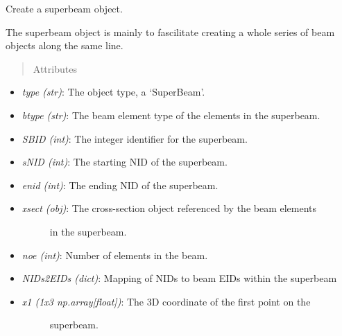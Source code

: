\documentclass[letterpaper,10pt,english]{sphinxmanual}
\begin{document}
\begin{fulllineitems}
\label{structures:AeroComBAT.Structures.SuperBeam}
Create a superbeam object.

The superbeam object is mainly to fascilitate creating a whole series of
beam objects along  the same line.
\begin{quote}\begin{description}
\item[{Attributes}] \leavevmode
\end{description}\end{quote}
\begin{itemize}
\item {} 
\emph{type (str)}: The object type, a `SuperBeam'.

\item {} 
\emph{btype (str)}: The beam element type of the elements in the superbeam.

\item {} 
\emph{SBID (int)}: The integer identifier for the superbeam.

\item {} 
\emph{sNID (int)}: The starting NID of the superbeam.

\item {} 
\emph{enid (int)}: The ending NID of the superbeam.

\item {} \begin{description}
\item[{\emph{xsect (obj)}: The cross-section object referenced by the beam elements}] \leavevmode
in the superbeam.

\end{description}

\item {} 
\emph{noe (int)}: Number of elements in the beam.

\item {} 
\emph{NIDs2EIDs (dict)}: Mapping of NIDs to beam EIDs within the superbeam

\item {} \begin{description}
\item[{\emph{x1 (1x3 np.array{[}float{]})}: The 3D coordinate of the first point on the}] \leavevmode
superbeam.


\end{description}
\end{itemize}
\end{fulllineitems}
\end{document}

